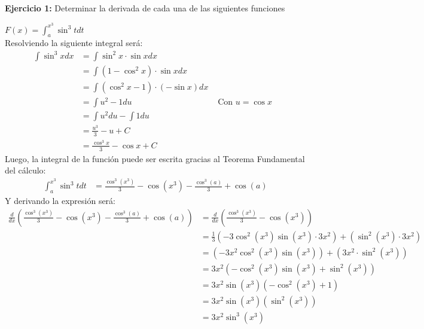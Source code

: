 \documentclass[../../main.tex]{subfiles}
\begin{document}
    \question \textbf{Ejercicio 1:} Determinar la derivada de cada una de las siguientes funciones
    \begin{partes}
        \parte $F(x) = \int_{a}^{x^3} \sin^3t dt$\\
        Resolviendo la siguiente integral será:
        \begin{align*}
            \int \sin^3x dx &= \int \sin^2x \cdot \sin x dx\\
            &= \int (1-\cos^2x) \cdot \sin x dx\\
            &= \int (\cos^2x-1) \cdot (-\sin x) dx\\
            &= \int u^2-1 du & \text{ Con $u = \cos x$ }\\ 
            &= \int u^2 du - \int 1 du\\
            &= \frac{u^3}{3} - u + C\\
            &= \frac{\cos^3x}{3} - \cos x + C
        \end{align*}
        Luego, la integral de la función puede ser escrita gracias al Teorema Fundamental del cálculo:
        \begin{align*}
            \int_{a}^{x^3} \sin^3t dt &= \frac{\cos^3(x^3)}{3} - \cos(x^3) - \frac{\cos^3(a)}{3} + \cos(a)
        \end{align*}
        Y derivando la expresión será:
        \begin{align*}
            \frac{d}{dx} \left(\frac{\cos^3(x^3)}{3} - \cos(x^3) - \frac{\cos^3(a)}{3} + \cos(a)\right) &= \frac{d}{dx}\left(\frac{\cos^3(x^3)}{3} - \cos(x^3)\right)\\
            &= \frac{1}{3} \left(-3\cos^2(x^3)\sin(x^3) \cdot 3x^2 \right) + (\sin^2(x^3) \cdot 3x^2)\\
            &= \left(-3x^2 \cos^2(x^3)\sin(x^3)\right) + (3x^2 \cdot \sin^2(x^3))\\
            &= 3x^2(-\cos^2(x^3)\sin(x^3) + \sin^2(x^3))\\
            &= 3x^2\sin(x^3)(-\cos^2(x^3)+1)\\
            &= 3x^2\sin(x^3)(\sin^2(x^3))\\
            &= 3x^2\sin^3(x^3)
        \end{align*}


\end{partes}
\end{document}

